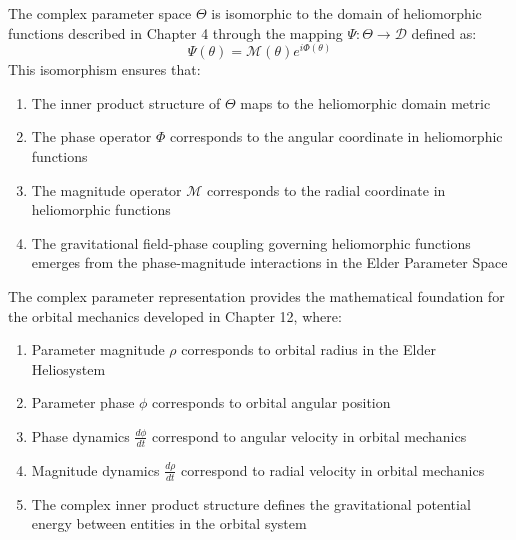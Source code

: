 \begin{theorem}
The complex parameter space $\Theta$ is isomorphic to the domain of heliomorphic functions described in Chapter 4 through the mapping $\Psi: \Theta \rightarrow \mathcal{D}$ defined as:
\begin{equation}
\Psi(\theta) = \mathcal{M}(\theta)e^{i\Phi(\theta)}
\end{equation}
This isomorphism ensures that:
\begin{enumerate}
    \item The inner product structure of $\Theta$ maps to the heliomorphic domain metric
    \item The phase operator $\Phi$ corresponds to the angular coordinate in heliomorphic functions
    \item The magnitude operator $\mathcal{M}$ corresponds to the radial coordinate in heliomorphic functions
    \item The gravitational field-phase coupling governing heliomorphic functions emerges from the phase-magnitude interactions in the Elder Parameter Space
\end{enumerate}
\end{theorem}

\begin{theorem}
The complex parameter representation provides the mathematical foundation for the orbital mechanics developed in Chapter 12, where:
\begin{enumerate}
    \item Parameter magnitude $\rho$ corresponds to orbital radius in the Elder Heliosystem
    \item Parameter phase $\phi$ corresponds to orbital angular position
    \item Phase dynamics $\frac{d\phi}{dt}$ correspond to angular velocity in orbital mechanics
    \item Magnitude dynamics $\frac{d\rho}{dt}$ correspond to radial velocity in orbital mechanics
    \item The complex inner product structure defines the gravitational potential energy between entities in the orbital system
\end{enumerate}
\end{theorem}

